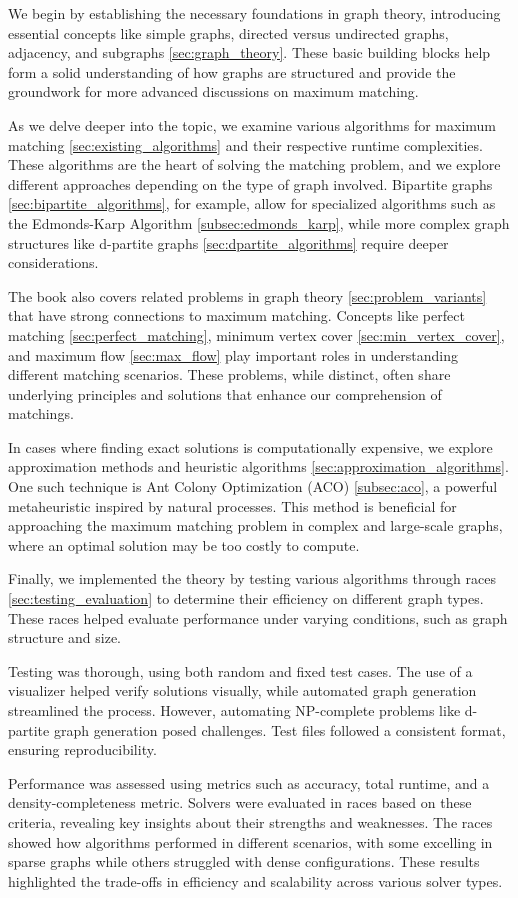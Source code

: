 We begin by establishing the necessary foundations in graph theory, introducing essential concepts like simple graphs, directed versus undirected graphs, adjacency, and subgraphs \ref{sec:graph_theory}. These basic building blocks help form a solid understanding of how graphs are structured and provide the groundwork for more advanced discussions on maximum matching.

As we delve deeper into the topic, we examine various algorithms for maximum matching \ref{sec:existing_algorithms} and their respective runtime complexities. These algorithms are the heart of solving the matching problem, and we explore different approaches depending on the type of graph involved. Bipartite graphs \ref{sec:bipartite_algorithms}, for example, allow for specialized algorithms such as the Edmonds-Karp Algorithm \ref{subsec:edmonds_karp}, while more complex graph structures like d-partite graphs \ref{sec:dpartite_algorithms} require deeper considerations.

The book also covers related problems in graph theory \ref{sec:problem_variants} that have strong connections to maximum matching. Concepts like perfect matching \ref{sec:perfect_matching}, minimum vertex cover \ref{sec:min_vertex_cover}, and maximum flow \ref{sec:max_flow}
play important roles in understanding different matching scenarios. These problems, while distinct, often share underlying principles and solutions that enhance our comprehension of matchings.

In cases where finding exact solutions is computationally expensive, we explore approximation methods and heuristic algorithms \ref{sec:approximation_algorithms}. One such technique is Ant Colony Optimization (ACO) \ref{subsec:aco}, a powerful metaheuristic inspired by natural processes. This method is beneficial for approaching the maximum matching problem in complex and large-scale graphs, where an optimal solution may be too costly to compute.

Finally, we implemented the theory by testing various algorithms through races \ref{sec:testing_evaluation} to determine their efficiency on different graph types. These races helped evaluate performance under varying conditions, such as graph structure and size.

Testing was thorough, using both random and fixed test cases. The use of a visualizer helped verify solutions visually, while automated graph generation streamlined the process. However, automating NP-complete problems like d-partite graph generation posed challenges. Test files followed a consistent format, ensuring reproducibility.

Performance was assessed using metrics such as accuracy, total runtime, and a density-completeness metric. Solvers were evaluated in races based on these criteria, revealing key insights about their strengths and weaknesses. The races showed how algorithms performed in different scenarios, with some excelling in sparse graphs while others struggled with dense configurations. These results highlighted the trade-offs in efficiency and scalability across various solver types.
